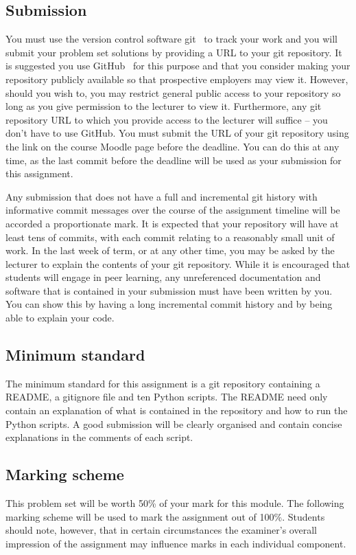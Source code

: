 \documentclass[a4paper, 12pt]{exam}
\begin{document}
\subsection*{Submission}
  You must use the version control software git~\cite{git} to track your work and you will submit your problem set solutions by providing a URL to your git repository.
  It is suggested you use GitHub~\cite{github} for this purpose and that you consider making your repository publicly available so that prospective employers may view it.
  However, should you wish to, you may restrict general public access to your repository so long as you give permission to the lecturer to view it.
  Furthermore, any git repository URL to which you provide access to the lecturer will suffice -- you don't have to use GitHub.  
  You must submit the URL of your git repository using the link on the course Moodle page before the deadline.
  You can do this at any time, as the last commit before the deadline will be used as your submission for this assignment.

  Any submission that does not have a full and incremental git history with informative commit messages over the course of the assignment timeline will be accorded a proportionate mark.
  It is expected that your repository will have at least tens of commits, with each commit relating to a reasonably small unit of work.
  In the last week of term, or at any other time, you may be asked by the lecturer to explain the contents of your git repository.
  While it is encouraged that students will engage in peer learning, any unreferenced documentation and software that is contained in your submission must have been written by you.
  You can show this by having a long incremental commit history and by being able to explain your code.


\subsection*{Minimum standard}
  The minimum standard for this assignment is a git repository containing a README, a gitignore file and ten Python scripts.
  The README need only contain an explanation of what is contained in the repository and how to run the Python scripts.
  A good submission will be clearly organised and contain concise explanations in the comments of each script.


\subsection*{Marking scheme}
  This problem set will be worth 50\% of your mark for this module.
  The following marking scheme will be used to mark the assignment out of 100\%.
  Students should note, however, that in certain circumstances the examiner's overall impression of the assignment may influence marks in each individual component.
\end{document}
